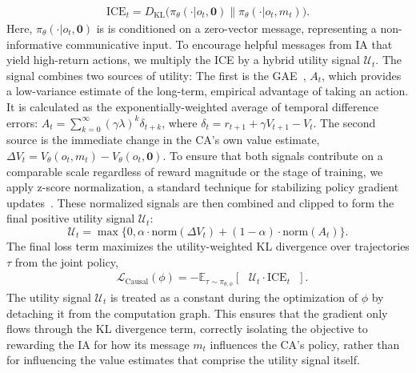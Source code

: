\documentclass[letterpaper]{article}
\begin{document}
\begin{align}
    \text{ICE}_t =D_{\text{KL}}\Big(\pi_{\theta}(\cdot|o_t, \mathbf{0}) \parallel \pi_{\theta}(\cdot|o_t, m_t)\Big). \tag{ICE}
    \label{eq:ice}
\end{align}
Here, $\pi_{\theta}(\cdot|o_t, \mathbf{0})$ is is conditioned on a zero-vector message, representing a non-informative communicative input.
To encourage helpful messages from IA that yield high-return actions, we multiply the ICE by a hybrid utility signal $\mathcal{U}_t$. The signal combines two sources of utility: The first is the GAE~\cite{schulman2015high}, $A_t$, which provides a low-variance estimate of the long-term, empirical advantage of taking an action. It is calculated as the exponentially-weighted average of temporal difference errors: $A_t = \sum_{k=0}^{\infty} (\gamma\lambda)^k \delta_{t+k}$, where $\delta_t = r_{t+1} + \gamma V_{t+1} - V_t$. The second source is the immediate change in the CA's own value estimate, $\Delta V_t = V_{\theta}(o_t, m_t) - V_{\theta}(o_t, \mathbf{0})$. To ensure that both signals contribute on a comparable scale regardless of reward magnitude or the stage of training, we apply z-score normalization, a standard technique for stabilizing policy gradient updates~\cite{schulman2017proximal, ioffe2015batch}. These normalized signals are then combined and clipped to form the final positive utility signal $\mathcal{U}_t$:
$$\mathcal{U}_t = \max\{0, \alpha \cdot \text{norm}(\Delta V_t) + (1-\alpha) \cdot \text{norm}(A_t)\}.$$
The final loss term maximizes the utility-weighted KL divergence over trajectories $\tau$ from the joint policy,
\begin{align*}
    &\mathcal{L}_{\text{Causal}}(\phi) = - \mathbb{E}_{\tau \sim \pi_{\theta, \phi}} \left[\mbox{ } \mathcal{U}_t \cdot \text{ICE}_t\mbox{ } \right].
\end{align*}
The utility signal $\mathcal{U}_t$ is treated as a constant during the optimization of $\phi$ by detaching it from the computation graph. This ensures that the gradient only flows through the KL divergence term, correctly isolating the objective to rewarding the IA for how its message $m_t$ influences the CA's policy, rather than for influencing the value estimates that comprise the utility signal itself.
\end{document}
